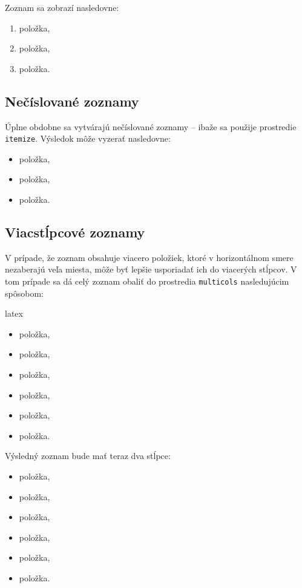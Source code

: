 Zoznam sa zobrazí nasledovne:
\begin{enumerate}
\item položka,
\item položka,
\item položka.
\end{enumerate}

\subsection{Nečíslované zoznamy}

Úplne obdobne sa vytvárajú nečíslované zoznamy -- ibaže sa použije prostredie \texttt{itemize}. Výsledok môže vyzerať nasledovne:
\begin{itemize}
\item položka,
\item položka,
\item položka.
\end{itemize}

\subsection{Viacstĺpcové zoznamy}

V prípade, že zoznam obsahuje viacero položiek, ktoré v horizontálnom smere nezaberajú veľa miesta, môže byť lepšie usporiadať ich do viacerých stĺpcov. V tom prípade sa dá celý zoznam obaliť do prostredia \texttt{multicols} nasledujúcim spôsobom:
\begin{inlinecode}{latex}
\begin{multicols}{2}
\begin{itemize}
\item položka,
\item položka,
\item položka,
\item položka,
\item položka,
\item položka.
\end{itemize}
\end{multicols}
\end{inlinecode}

Výsledný zoznam bude mať teraz dva stĺpce:
\begin{multicols}{2}
\begin{itemize}
\item položka,
\item položka,
\item položka,
\item položka,
\item položka,
\item položka.
\end{itemize}
\end{multicols}

